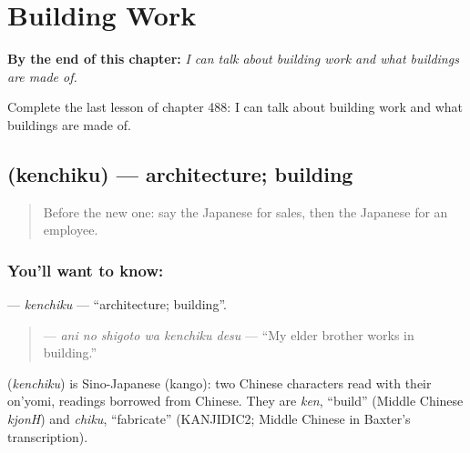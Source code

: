 
\chapter{Building Work}
\label{ch:ja-building-work}

\begin{chapteropening}
\textbf{By the end of this chapter:} \emph{I can talk about building work and what buildings are made of.}

Complete the last lesson of chapter 488: I can talk about building work and what buildings are made of.
\end{chapteropening}

\section[\texorpdfstring{\ja{けんちく} (kenchiku)}{けんちく (kenchiku)}]{ (kenchiku) — architecture; building}

\label{lesson:JA-C488-kenchiku}



\begin{quote}
Before the new one: say the Japanese for sales, then the Japanese for an employee.
\end{quote}

\subsection*{You'll want to know: }
\textbf{} — \emph{kenchiku} — \textquotedblleft{}architecture; building\textquotedblright{}.

\begin{quote}
\textbf{  } — \emph{ani no shigoto wa kenchiku desu} — \textquotedblleft{}My elder brother works in building.\textquotedblright{}
\end{quote}

\begin{cousinweb}
\textbf{} (\emph{kenchiku}) is Sino-Japanese (kango): two Chinese characters read with their on'yomi, readings borrowed from Chinese. They are \emph{ken}, \textquotedblleft{}build\textquotedblright{} (Middle Chinese \emph{kjonH}) and \emph{chiku}, \textquotedblleft{}fabricate\textquotedblright{} (KANJIDIC2; Middle Chinese in Baxter's transcription).
\end{cousinweb}

